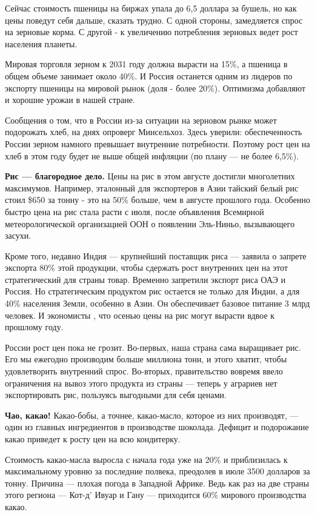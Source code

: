 Сейчас стоимость пшеницы на биржах упала до 6,5 доллара за бушель, но как цены поведут себя дальше, сказать трудно. С одной стороны, замедляется спрос на зерновые корма. С другой - к увеличению потребления зерновых ведет рост населения планеты.

Мировая торговля зерном к 2031 году должна вырасти на 15\%, а пшеница в общем объеме занимает около 40\%. И Россия останется одним из лидеров по экспорту пшеницы на мировой рынок (доля - более 20\%). Оптимизма добавляют и хорошие урожаи в нашей стране.

Сообщения о том, что в России из-за ситуации на зерновом рынке может подорожать хлеб, на днях опроверг Минсельхоз. Здесь уверили: обеспеченность России зерном намного превышает внутренние потребности. Поэтому рост цен на хлеб в этом году будет не выше общей инфляции (по плану --- не более 6,5\%).

\textbf{Рис --- благородное дело.} Цены на рис в этом августе достигли многолетних максимумов. Например, эталонный для экспортеров в Азии тайский белый рис стоил \$650 за тонну - это на 50\% больше, чем в августе прошлого года. Особенно быстро цена на рис стала расти с июля, после объявления Всемирной метеорологической организацией ООН о появлении Эль-Ниньо, вызывающего засухи.

Кроме того, недавно Индия --- крупнейший поставщик риса --- заявила о запрете экспорта 80\% этой продукции, чтобы сдержать рост внутренних цен на этот стратегический для страны товар. Временно запретили экспорт риса ОАЭ и Россия. Но стратегическим продуктом рис остается не только для Индии, а для 40\% населения Земли, особенно в Азии. Он обеспечивает базовое питание 3 млрд человек. И экономисты , что осенью цены на рис могут вырасти вдвое к прошлому году.

России рост цен пока не грозит. Во-первых, наша страна сама выращивает рис. Его мы ежегодно производим больше миллиона тонн, и этого хватит, чтобы удовлетворить внутренний спрос. Во-вторых, правительство вовремя ввело ограничения на вывоз этого продукта из страны --- теперь у аграриев нет  экспортировать рис, пользуясь выгодными для себя ценами.

\textbf{Чао, какао!} Какао-бобы, а точнее, какао-масло, которое из них производят, --- один из главных ингредиентов в производстве шоколада. Дефицит и подорожание какао приведет к росту цен на всю кондитерку.

Стоимость какао-масла выросла с начала года уже на 20\% и приблизилась к максимальному уровню за последние полвека, преодолев в июле  3500 долларов за тонну. Причина --- плохая погода в Западной Африке. Ведь как раз на две страны этого региона --- Кот-д' Ивуар и Гану --- приходится 60\% мирового производства какао.

